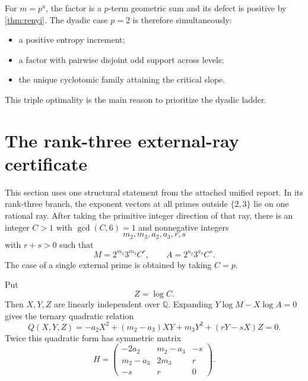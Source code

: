 \documentclass[11pt]{article}
\theoremstyle{definition}
\newcommand{\Q}{\mathbb Q}
\begin{document}
For $m=p^a$, the factor is a $p$-term geometric sum and its defect is positive by
\cref{thm:renyi}.  The dyadic case $p=2$ is therefore simultaneously:
\begin{itemize}
\item a positive entropy increment;
\item a factor with pairwise disjoint odd support across levels;
\item the unique cyclotomic family attaining the critical slope.
\end{itemize}
This triple optimality is the main reason to prioritize the dyadic ladder.

\section{The rank-three external-ray certificate}\label{sec:rank-three}

This section uses one structural statement from the attached unified report.  In its
rank-three branch, the exponent vectors at all primes outside $\{2,3\}$ lie on one rational
ray.  After taking the primitive integer direction of that ray, there is an integer
$C>1$ with $\gcd(C,6)=1$ and nonnegative integers
\begin{equation}\label{eq:external-ray-param}
 m_2,m_3,a_2,a_3,r,s
\end{equation}
with $r+s>0$ such that
\begin{equation}\label{eq:external-ray-MA}
 M=2^{m_2}3^{m_3}C^r,
 \qquad
 A=2^{a_2}3^{a_3}C^s.
\end{equation}
The case of a single external prime is obtained by taking $C=p$.

Put
\begin{equation}\label{eq:ZlogC}
 Z=\log C.
\end{equation}
Then $X,Y,Z$ are linearly independent over $\Q$.  Expanding
$Y\log M-X\log A=0$ gives the ternary quadratic relation
\begin{equation}\label{eq:Q-ray}
 Q(X,Y,Z)=
 -a_2X^2+(m_2-a_3)XY+m_3Y^2+(rY-sX)Z=0.
\end{equation}
Twice this quadratic form has symmetric matrix
\begin{equation}\label{eq:H-ray}
 H=
 \begin{pmatrix}
 -2a_2&m_2-a_3&-s\\
 m_2-a_3&2m_3&r\\
 -s&r&0
 \end{pmatrix}.
\end{equation}
\end{document}
